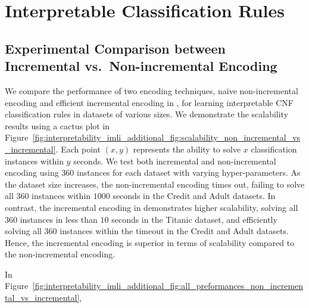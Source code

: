 \chapter{Interpretable Classification Rules}

\section{Experimental Comparison between Incremental vs.\ Non-incremental  Encoding}
We compare the performance of two encoding techniques, na\"ive non-incremental encoding and efficient incremental encoding in {\imli}, for learning interpretable CNF classification rules in datasets of various sizes. We demonstrate the scalability results using a cactus plot in Figure~\ref{fig:interpretability_imli_additional_fig:scalability_non_incremental_vs_incremental}. Each point $ (x, y) $ represents the ability to solve $ x $ classification instances within $ y $ seconds. We test both incremental and non-incremental encoding using $ 360 $ instances for each dataset with varying hyper-parameters. As the dataset size increases, the non-incremental encoding times out, failing to solve all $ 360 $ instances within $ 1000 $ seconds in the Credit and Adult datasets. In contrast, the incremental encoding in {\imli} demonstrates higher scalability, solving all $ 360 $ instances in less than $ 10 $ seconds in the Titanic dataset, and efficiently solving all $ 360 $ instances within the timeout in the Credit and Adult datasets. Hence, the incremental encoding is superior in terms of scalability compared to the non-incremental encoding.

In Figure~\ref{fig:interpretability_imli_additional_fig:all_preformances_non_incremental_vs_incremental}, 


